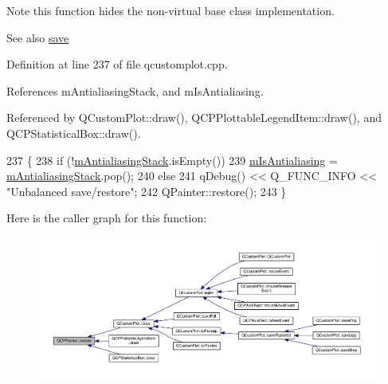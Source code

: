 \begin{DoxyNote}{Note}
this function hides the non-\/virtual base class implementation.
\end{DoxyNote}
\begin{DoxySeeAlso}{See also}
\hyperlink{class_q_c_p_painter_a8fd6821ee6fecbfa04444c9062912abd}{save} 
\end{DoxySeeAlso}


Definition at line 237 of file qcustomplot.\+cpp.



References m\+Antialiasing\+Stack, and m\+Is\+Antialiasing.



Referenced by Q\+Custom\+Plot\+::draw(), Q\+C\+P\+Plottable\+Legend\+Item\+::draw(), and Q\+C\+P\+Statistical\+Box\+::draw().


\begin{DoxyCode}
237                          \{
238   \textcolor{keywordflow}{if} (!\hyperlink{class_q_c_p_painter_a0189e641bbf7dc31ac15aef7b36501fa}{mAntialiasingStack}.isEmpty())
239     \hyperlink{class_q_c_p_painter_a7055085da176aee0f6b23298f1003d08}{mIsAntialiasing} = \hyperlink{class_q_c_p_painter_a0189e641bbf7dc31ac15aef7b36501fa}{mAntialiasingStack}.pop();
240   \textcolor{keywordflow}{else}
241     qDebug() << Q\_FUNC\_INFO << \textcolor{stringliteral}{"Unbalanced save/restore"};
242   QPainter::restore();
243 \}
\end{DoxyCode}


Here is the caller graph for this function\+:\nopagebreak
\begin{figure}[H]
\begin{center}
\leavevmode
\includegraphics[width=350pt]{class_q_c_p_painter_a64908e6298d5bbd83457dc987cc3a022_icgraph}
\end{center}
\end{figure}


\hypertarget{class_q_c_p_painter_a8fd6821ee6fecbfa04444c9062912abd}{}
